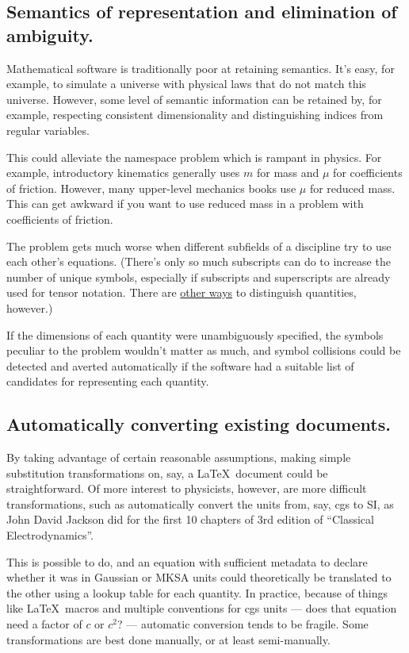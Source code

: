 \documentclass[12pt,letterpaper]{article}
\begin{document}
\subsection{Semantics of representation and elimination of ambiguity.}

Mathematical software is traditionally poor at retaining semantics.
It's easy, for example,
to simulate a universe with physical laws that do not match this universe.
However, some level of semantic information can be retained by,
for example, respecting consistent dimensionality and distinguishing indices from regular variables.

This could alleviate the namespace problem which is rampant in physics.
For example,
introductory kinematics generally uses $m$ for mass and $\mu$ for coefficients of friction.
However, many upper-level mechanics books use $\mu$ for reduced mass.
This can get awkward if you want to use reduced mass in a problem with coefficients of friction.

The problem gets much worse when different subfields of a discipline try to use each other's equations.
(There's only so much subscripts can do to increase the number of unique symbols,
especially if subscripts and superscripts are already used for tensor notation.
There are \hyperref[color-coding]{other ways} to distinguish quantities, however.)

If the dimensions of each quantity were unambiguously specified,
the symbols peculiar to the problem wouldn't matter as much,
and symbol collisions could be detected and averted automatically
if the software had a suitable list of candidates for representing each quantity.

\subsection{Automatically converting existing documents.}

By taking advantage of certain reasonable assumptions,
making simple substitution transformations on, say,
a \LaTeX\ document could be straightforward.
Of more interest to physicists, however,
are more difficult transformations,
such as automatically convert the units from,
say, cgs to SI,
as John David Jackson did for the first 10 chapters of 3rd edition of ``Classical Electrodynamics''.

This is possible to do,
and an equation with sufficient metadata to declare whether it was in Gaussian or MKSA units
could theoretically be translated to the other using a lookup table for each quantity.
In practice,
because of things like \LaTeX\ macros and multiple conventions for cgs units
--- does that equation need a factor of $c$ or $c^2$? ---
automatic conversion tends to be fragile.
Some transformations are best done manually,
or at least semi-manually.
\end{document}
